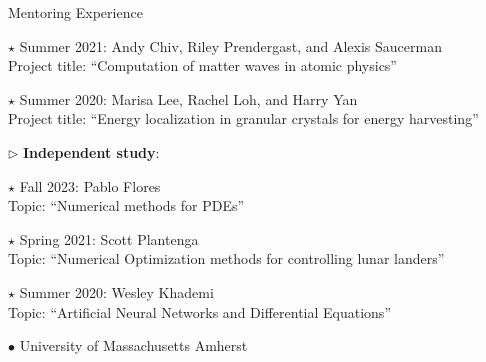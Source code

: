 \documentclass[10pt]{article} %
\newenvironment{outerlist}[1][\enskip\textbullet]%
        {\begin{itemize}[#1]}{\end{itemize}%
         \vspace{-.6\baselineskip}}
\newenvironment{innerlist}[1][\enskip\textbullet]%
        {\begin{compactitem}[#1]}{\end{compactitem}}
\begin{document}
\begin{section}{Mentoring Experience}
\begin{outerlist}
\begin{innerlist}
\begin{innerlist}
\item[$\star$] Summer 2021: Andy Chiv, Riley Prendergast, and Alexis Saucerman\\
Project title: ``Computation of matter waves in atomic physics''
\item[$\star$] Summer 2020: Marisa Lee, Rachel Loh, and Harry Yan \\
Project title: ``Energy localization in granular crystals for energy harvesting''
\end{innerlist}
\item[$\triangleright$] \textbf{Independent study}:
\begin{innerlist}
\item[$\star$] Fall 2023: Pablo Flores \\
Topic: ``Numerical methods for PDEs''
\item[$\star$] Spring 2021: Scott Plantenga \\
Topic: ``Numerical Optimization methods for controlling lunar landers''
\item[$\star$] Summer 2020: Wesley Khademi \\
Topic: ``Artificial Neural Networks and Differential Equations''
\end{innerlist}
\end{innerlist}


\item[$\bullet$] University of Massachusetts Amherst

\begin{innerlist}


\end{innerlist}
\end{outerlist}
\end{section}
\end{document}
